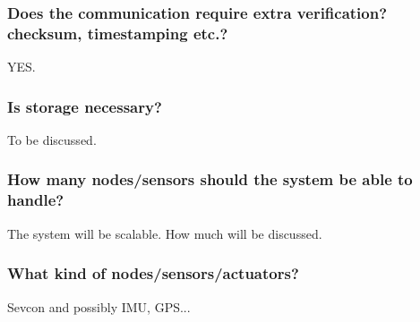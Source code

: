 \subsubsection{Does the communication require extra verification? checksum, timestamping etc.?}
YES.

\subsubsection{Is storage necessary?}
To be discussed.

\subsubsection{How many nodes/sensors should the system be able to handle?}
The system will be scalable. How much will be discussed.

\subsubsection{What kind of nodes/sensors/actuators?}
Sevcon and possibly IMU, GPS...

